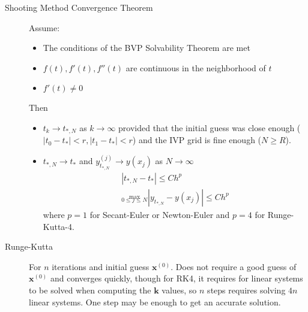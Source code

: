 \documentclass[8pt]{article}
\begin{document}
\begin{multicols}{2}
\begin{description}
  \item[Shooting Method Convergence Theorem]
    Assume:
    \begin{itemize}
    \item The conditions of the BVP Solvability Theorem are met
    \item $f(t), f'(t), f''(t)$ are continuous in the neighborhood of $t$
    \item $f'(t) \neq 0$
    \end{itemize}
    Then
    \begin{itemize}
    \item $t_k \rightarrow t_{*,N}$ as $k\rightarrow\infty$ provided
      that the initial guess was close enough ($|t_0-t_*|<r,
      |t_1-t_*|<r$) and the IVP grid is fine enough ($N\geq R$).
    \item $t_{*,N} \rightarrow t_*$ and $y_{t_{*,N}}^{(j)} \rightarrow
      y(x_{j})$ as $N\rightarrow\infty$
        \begin{gather*}
          |t_{*,N}-t_*| \leq Ch^p \\
          \stackrel{\text{max}}{_{0\leq j\leq N}}  |y_{t_{*,N}}-y(x_j)| \leq Ch^p
        \end{gather*}
      where $p=1$ for Secant-Euler or Newton-Euler and $p=4$ for
      Runge-Kutta-4.
    \end{itemize}

  \item[Runge-Kutta] For $n$ iterations and initial guess $\mathbf{x}^{(0)}$. Does not require a
    good guess of $\mathbf{x}^{(0)}$ and converges quickly, though for RK4, it requires for linear
    systems to be solved when computing the $\mathbf{k}$ values, so $n$ steps requires solving
    $4n$ linear systems. One step may be enough to get an accurate solution.


\end{description}
\end{multicols}
\end{document}
